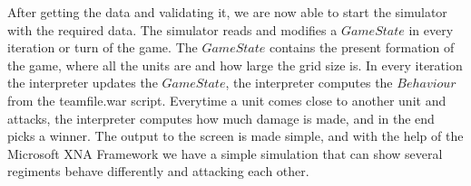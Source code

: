 After getting the data and validating it, we are now able to start the simulator with the required data. 
The simulator reads and modifies a $GameState$ in every iteration or turn of the game. The $GameState$ contains the present formation of the game, where all the units are and how large the grid size is. In every iteration the interpreter updates the $GameState$, the interpreter computes the $Behaviour$ from the teamfile.war script. Everytime a unit comes close to another unit and attacks, the interpreter computes how much damage is made, and in the end picks a winner. The output to the screen is made simple, and with the help of the Microsoft XNA \cite{XNA} Framework we have a simple simulation that can show several regiments behave differently and attacking each other.








